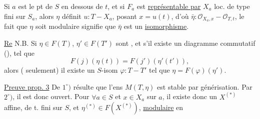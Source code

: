 Si $a$ est le pt de $S$ en dessous de $t$, et si $F_a$ est \uline{représentable par} $X_a$  loc. de type fini sur $S_a$,  alors $\eta$ définit $u:T\mathbin{-}X_a$, posant $x=u(t)$, d'où $\bar\eta:\mathcal O_{X_a,x}\mathbin{-}\mathcal O_{T,t}$, le fait que $\eta$ soit modulaire  signifie que $\bar\eta$ est un \uline{isomorphisme}.

\uline{Re} N.B. Si $\eta\in F(T)$, $\eta'\in F(T')$ sont  , et s'il existe un diagramme commutatif (), tel que
\[
F(j)(\eta(t))=F(j')(\eta'(t')),
\]
alors ( seulement) il existe un $S$-isom $\varphi:T\mathbin{-}T'$ tel que $\eta=F(\varphi)(\eta')$.


\uline{Preuve prop. 3}  De $1^\circ)$ résulte que l'ens  $M(T,\eta)$ est stable par  générisation. Par $2^\circ)$, il est donc ouvert.   Pour $\forall a\in S$ et $x\in X_a$ sur $a$,  il existe donc un  $X^{(*)}$  affine,  de t. fini sur $S$, et $\eta^{(*)}\in F(X^{(*)})$, \uline{modulaire}  en
